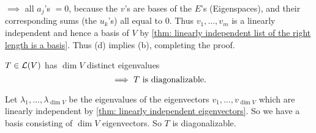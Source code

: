 \begin{prf}
  $\implies$ all $a_j$'s $=0$, because the $v$'s are bases of the $E$'s  (Eigenspaces), and their corresponding sums (the $u_k$'s) all equal to $0$. Thus $v_1, \ldots, v_m$ is a linearly independent and hence a basis of $V$ by \ref{thm: linearly independent list of the right length is a basis}. Thus (d) implies (b), completing the proof.
\end{prf}

\setcounter{thm}{57}
\begin{thm} 
  \label{thm: enough eigenvalues implies diagonalizability}
  $T\in \mathcal{L}(V)$ has $\dim V$ distinct eigenvalues
  \begin{equation}
    \implies$ $T$ is diagonalizable.$
  \end{equation}
\end{thm}
\begin{prf}
  Let $\lambda_1, \ldots, \lambda_{\dim V}$ be the eigenvalues of the eigenvectors $v_1, \ldots, v_{\dim V}$ which are linearly independent by \autoref{thm: linearly independent eigenvectors}. So we have a basis consisting of $\dim V$ eigenvectors. So $T$ is diagonalizable.
\end{prf}

